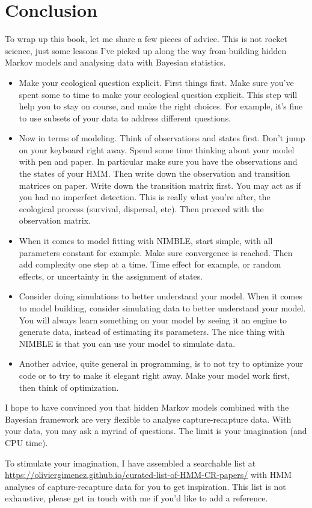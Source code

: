 \documentclass[
  12pt,
]{krantz}
\begin{document}
\chapter*{Conclusion}\label{conclusion}


To wrap up this book, let me share a few pieces of advice. This is not rocket science, just some lessons I've picked up along the way from building hidden Markov models and analysing data with Bayesian statistics.

\begin{itemize}
\item
  Make your ecological question explicit. First things first. Make sure you've spent some to time to make your ecological question explicit. This step will help you to stay on course, and make the right choices. For example, it's fine to use subsets of your data to address different questions.
\item
  Now in terms of modeling. Think of observations and states first. Don't jump on your keyboard right away. Spend some time thinking about your model with pen and paper. In particular make sure you have the observations and the states of your HMM. Then write down the observation and transition matrices on paper. Write down the transition matrix first. You may act as if you had no imperfect detection. This is really what you're after, the ecological process (survival, dispersal, etc). Then proceed with the observation matrix.
\item
  When it comes to model fitting with NIMBLE, start simple, with all parameters constant for example. Make sure convergence is reached. Then add complexity one step at a time. Time effect for example, or random effects, or uncertainty in the assignment of states.
\item
  Consider doing simulations to better understand your model. When it comes to model building, consider simulating data to better understand your model. You will always learn something on your model by seeing it an engine to generate data, instead of estimating its parameters. The nice thing with NIMBLE is that you can use your model to simulate data.
\item
  Another advice, quite general in programming, is to not try to optimize your code or to try to make it elegant right away. Make your model work first, then think of optimization.
\end{itemize}

I hope to have convinced you that hidden Markov models combined with the Bayesian framework are very flexible to analyse capture-recapture data. With your data, you may ask a myriad of questions. The limit is your imagination (and CPU time).

To stimulate your imagination, I have assembled a searchable list at \url{https://oliviergimenez.github.io/curated-list-of-HMM-CR-papers/} with HMM analyses of capture-recapture data for you to get inspiration. This list is not exhaustive, please get in touch with me if you'd like to add a reference.

\backmatter

  

\printindex
\end{document}
